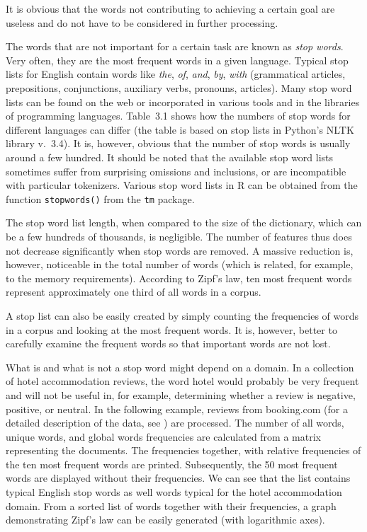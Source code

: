 It is obvious that the words not contributing to achieving a certain goal are
useless and do not have to be considered in further processing.

The words that are not important for a certain task are known as \textit{stop words}.
Very often, they are the most frequent words in a given language. Typical stop
lists for English contain words like \textit{the}, \textit{of}, \textit{and}, \textit{by}, 
\textit{with} (grammatical articles, prepositions, conjunctions, auxiliary verbs, pronouns, articles). 
Many stop word lists can be found on the web or incorporated in various tools and in the libraries
of programming languages. Table~3.1 shows how the numbers of stop words
for different languages can differ (the table is based on stop lists in Python’s
NLTK library v.~3.4). It is, however, obvious that the number of stop words is
usually around a few hundred. It should be noted that the available stop word lists
sometimes suffer from surprising omissions and inclusions, or are incompatible
with particular tokenizers\cite{ref207}. Various stop word lists in R can be obtained
from the function \texttt{stopwords()} from the \texttt{tm} package.

The stop word list length, when compared to the size of the dictionary, which
can be a few hundreds of thousands, is negligible. The number of features thus
does not decrease significantly when stop words are removed. A massive reduction is, however, noticeable in the total number of words (which is related, for
example, to the memory requirements). According to Zipf’s law, ten most frequent words represent approximately one third of all words in a corpus.

A stop list can also be easily created by simply counting the frequencies of
words in a corpus and looking at the most frequent words. It is, however, better
to carefully examine the frequent words so that important words are not lost.

What is and what is not a stop word might depend on a domain. In a collection
of hotel accommodation reviews, the word hotel would probably be very frequent
and will not be useful in, for example, determining whether a review is negative,
positive, or neutral. In the following example, reviews from booking.com (for
a detailed description of the data, see \cite{ref295}) are processed. The number of all
words, unique words, and global words frequencies are calculated from a matrix
representing the documents. The frequencies together, with relative frequencies
of the ten most frequent words are printed. Subsequently, the 50 most frequent
words are displayed without their frequencies. We can see that the list contains
typical English stop words as well words typical for the hotel accommodation
domain. From a sorted list of words together with their frequencies, a graph
demonstrating Zipf’s law can be easily generated (with logarithmic axes).


